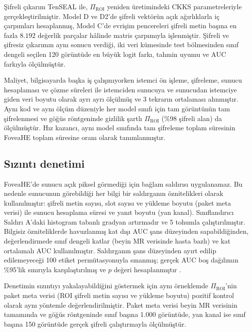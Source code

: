 Şifreli çıkarım TenSEAL ile, $\Pi_{\mathrm{ROI}}$ yeniden üretimindeki CKKS parametreleriyle gerçekleştirilmiştir. Model D ve D2'de şifreli vektörün açık ağırlıklarla iç çarpımları hesaplanmış, Model C'de evrişim pencereleri şifreli metin başına en fazla $8.192$ değerlik parçalar hâlinde matris çarpımıyla işlenmiştir. Şifreli ve şifresiz çıkarımın aynı sonucu verdiği, iki veri kümesinde test bölmesinden sınıf dengeli seçilen 120 görüntüde en büyük logit farkı, tahmin uyumu ve AUC farkıyla ölçülmüştür.

Maliyet, bilgisayarda başka iş çalışmıyorken istemci ön işleme, şifreleme, sunucu hesaplaması ve çözme süreleri ile istemciden sunucuya ve sunucudan istemciye giden veri boyutu olarak ayrı ayrı ölçülmüş ve 3 tekrarın ortalaması alınmıştır. Aynı kod ve aynı ölçüm düzeniyle her model sınıfı için tam görüntünün tam şifrelenmesi ve göğüs röntgeninde gizlilik şartlı $\Pi_{\mathrm{ROI}}$ (\%98 şifreli alan) da ölçülmüştür. Hız kazancı, aynı model sınıfında tam şifreleme toplam süresinin FoveaHE toplam süresine oranı olarak tanımlanmıştır.

\subsection{Sızıntı denetimi}\label{sec:fov:leakage}

FoveaHE'de sunucu açık piksel görmediği için bağlam saldırısı uygulanamaz. Bu nedenle sunucunun görebildiği her bilgi bir saldırganın öznitelikleri olarak kullanılmıştır: şifreli metin sayısı, slot sayısı ve yükleme boyutu (paket meta verisi) ile sunucu hesaplama süresi ve yanıt boyutu (yan kanal). Sınıflandırıcı Saldırı A'daki histogram tabanlı gradyan artırmadır ve 5 tohumla çalıştırılmıştır. Bilgisiz özniteliklerde havuzlanmış kat dışı AUC şans düzeyinden sapabildiğinden, değerlendirmede sınıf dengeli katlar (beyin MR verisinde hasta bazlı) ve kat ortalamalı AUC kullanılmıştır. Saldırganın şans düzeyinden ayırt edilip edilemeyeceği 100 etiket permütasyonuyla sınanmış; gerçek AUC boş dağılımın \%95'lik sınırıyla karşılaştırılmış ve $p$ değeri hesaplanmıştır \cite{ojala2010permutation}.

Denetimin sızıntıyı yakalayabildiğini göstermek için aynı örneklemde $\Pi_{\mathrm{ROI}}$'nin paket meta verisi (ROI şifreli metin sayısı ve yükleme boyutu) pozitif kontrol olarak aynı yöntemle değerlendirilmiştir. Paket meta verisi beyin MR verisinin tamamında ve göğüs röntgeninde sınıf başına 1.000 görüntüde, yan kanal ise sınıf başına 150 görüntüde gerçek şifreli çalıştırmayla ölçülmüştür.

